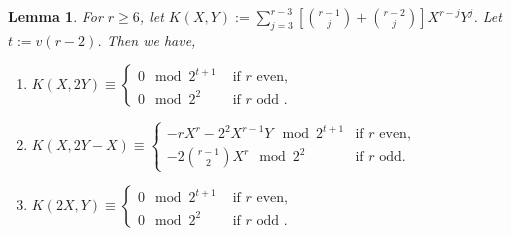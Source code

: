 \documentclass[11pt, reqno]{amsart}
\numberwithin{equation}{section}
\newtheorem{lemma}[thm]{Lemma}
\theoremstyle{definition}
\theoremstyle{remark}
\theoremstyle{definition}
\theoremstyle{remark}
\theoremstyle{remark}
\begin{document}
\begin{lemma}\label{K}
For $r\geq 6$, let $K(X,Y):= \displaystyle\sum_{j=3}^{r-3}\left[{r-1 \choose j}+{r-2\choose j} \right]X^{r-j}Y^j$. %
Let $t:=v(r-2)$. Then we have,
\begin{enumerate}
    \item $K(X,2Y) \equiv \begin{cases}
        0\mod 2^{t+1} & \text{ if }r\text{ even},\\
        0\mod 2^2 & \text{ if }r\text{ odd }.
        \end{cases} $
    \item $K(X,2Y-X) \equiv\begin{cases}
    -rX^{r}-2^2X^{r-1}Y\mod 2^{t+1} & \text{if $r$ even,}\label{Kb}\\
     -2{r-1 \choose 2}X^{r} \mod 2^{2}& \text{if $r$ odd.}    \end{cases}$
    \item $K(2X,Y) \equiv \begin{cases}
        0\mod 2^{t+1} & \text{ if }r\text{ even},\\
        0\mod 2^2 & \text{ if }r\text{ odd }.
        \end{cases} $
    \end{enumerate}
\end{lemma}
\end{document}

